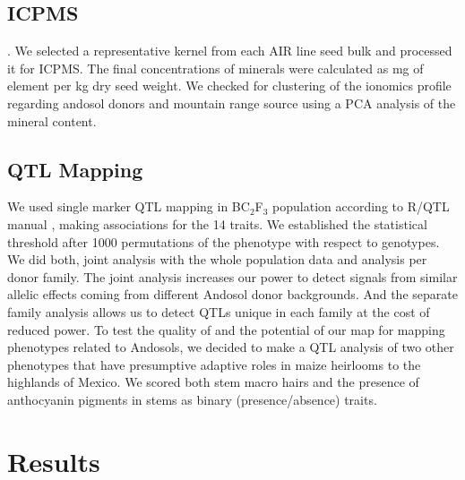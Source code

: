 \subsection{ICPMS}.
We selected a representative kernel from each AIR line seed bulk and processed it for ICPMS.
The final concentrations of minerals were calculated as mg of element per kg dry seed weight. We checked for clustering of the ionomics profile regarding andosol donors and mountain range source using a PCA analysis of the mineral content.

\subsection{QTL Mapping}
We used single marker QTL mapping in BC$_2$F$_3$ population according to R/QTL manual \citep{broman2012},  making associations for the 14 traits.  We established the statistical threshold after  1000 permutations of the phenotype with respect to genotypes.  We did both, joint analysis with the whole population data and analysis per donor family.
The joint analysis increases our power to detect signals from similar allelic effects coming from different Andosol donor backgrounds.
And the separate family analysis allows us to detect QTLs unique in each family at the cost of reduced power. To test the quality of and the potential of  our map for mapping phenotypes related to  Andosols, we decided to make  a QTL analysis of two other phenotypes that have presumptive adaptive roles in maize heirlooms to the highlands of Mexico.
We scored both stem macro hairs and  the presence of anthocyanin pigments in stems as binary (presence/absence) traits. 


\section{Results}
